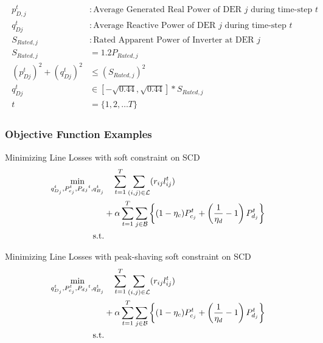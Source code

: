\begin{gather}
	\begin{align}
		{p^t_{D,j}} &: {\text{Average Generated Real Power of DER $j$ during time-step $t$}} \nonumber\\
		{q^t_{Dj}} &: {\text{Average Reactive Power of DER $j$ during time-step $t$ }} \nonumber\\
		{S_{Rated, j}} &: {\text{Rated Apparent Power of Inverter at DER $j$}} \nonumber\\
		{S_{Rated,j}} &= {1.2P_{Rated,j}} \\
		{ (p^t_{Dj})^2 + (q^t_{Dj})^2} &\leq {(S_{Rated,j})^2} \\
		{q^t_{Dj}} &\in {[-\sqrt{0.44}, \sqrt{0.44}]*S_{Rated,j}} \\
		{t} &= {\{1, 2, \ldots T\}}\nonumber
	\end{align}
\end{gather}

\subsubsection{Objective Function Examples}

Minimizing Line Losses with soft constraint on SCD
\begin{gather}
	\begin{align}
		\min_{
		\substack{
		q_{D_j}^t, P_{c_j}^t, P_d{_j}^t, q_{B_j}^t}
		} 
		\vspace{-15ex} %
		& \quad
		\sum_{t = 1}^{T} \sum_{(i, j) \in \mathcal{L}} (r_{ij}l_{ij}^t) \\
		&+ \alpha \sum_{t = 1}^{T} \sum_{j \in \mathcal{B}} \left\{ (1- \eta_c)P_{c_j}^t + \left(\frac{1}{\eta_d}-1\right) P_{d_j}^t \right\} \nonumber\\
		\text{s.t.} & {}\nonumber
	\end{align}
\end{gather}

Minimizing Line Losses with peak-shaving soft constraint on SCD
\begin{gather}
	\begin{align}
		\min_{
		\substack{
		q_{D_j}^t, P_{c_j}^t, P_d{_j}^t, q_{B_j}^t}
		} 
		\vspace{-15ex} %
		& \quad
		\sum_{t = 1}^{T} \sum_{(i, j) \in \mathcal{L}} (r_{ij}l_{ij}^t) \\
		&+ \alpha \sum_{t = 1}^{T} \sum_{j \in \mathcal{B}} \left\{ (1- \eta_c)P_{c_j}^t + \left(\frac{1}{\eta_d}-1\right) P_{d_j}^t \right\} \nonumber\\
		\text{s.t.} & {}\nonumber
	\end{align}
\end{gather}


